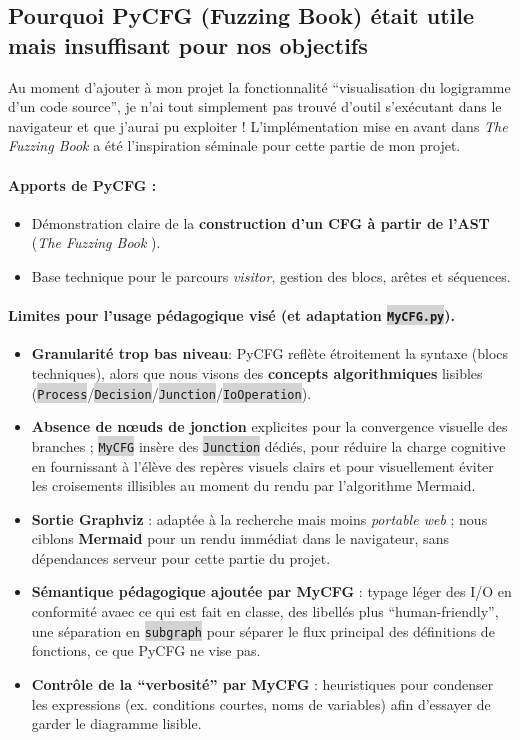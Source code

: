 \documentclass[11pt,a4paper]{article}
\let\cite\parencite
\newcommand{\code}[1]{\colorbox{lightgray}{\texttt{\small #1}}}
\begin{document}
\subsection{Pourquoi PyCFG (Fuzzing Book) était utile mais insuffisant pour nos objectifs}
Au moment d'ajouter à mon projet la fonctionnalité ``visualisation du logigramme d'un code source'', je n'ai tout simplement pas trouvé d'outil s'exécutant dans le navigateur et que j'aurai pu exploiter ! L'implémentation mise en avant dans \textit{The Fuzzing Book} a été l'inspiration séminale pour cette partie de mon projet.
\paragraph{Apports de PyCFG :}
\begin{itemize}
    \item Démonstration claire de la \textbf{construction d'un CFG à partir de l'AST} (\textit{The Fuzzing Book} \cite{fuzzingbook}).
    \item Base technique pour le parcours \textit{visitor}, gestion des blocs, arêtes et séquences.
\end{itemize}

\paragraph{Limites pour l'usage pédagogique visé (et adaptation \code{MyCFG.py}).}
\begin{itemize}
    \item \textbf{Granularité trop bas niveau}: PyCFG reflète étroitement la syntaxe (blocs techniques), alors que nous visons des \textbf{concepts algorithmiques} lisibles (\code{Process}/\code{Decision}/\code{Junction}/\code{IoOperation}).
    \item \textbf{Absence de nœuds de jonction} explicites pour la convergence visuelle des branches ; \code{MyCFG} insère des \code{Junction} dédiés, pour réduire la charge cognitive en fournissant à l'élève des repères 
    visuels clairs et pour visuellement éviter les croisements illisibles au moment du rendu par l'algorithme Mermaid.
    \item \textbf{Sortie Graphviz} : adaptée à la recherche mais moins \textit{portable web} ; nous ciblons \textbf{Mermaid} pour un rendu immédiat dans le navigateur, sans dépendances serveur pour cette partie du projet.
    \item \textbf{Sémantique pédagogique ajoutée par MyCFG} : typage léger des I/O en conformité avaec ce qui est fait en classe, des libellés plus ``human-friendly'', une séparation en \code{subgraph} pour séparer le flux principal des définitions de fonctions, ce que PyCFG ne vise pas.
    \item \textbf{Contrôle de la ``verbosité'' par MyCFG} : heuristiques pour condenser les expressions (ex. conditions courtes, noms de variables) afin d'essayer de garder le diagramme lisible.
\end{itemize}
\end{document}

